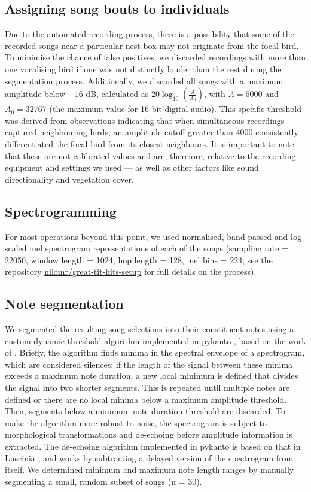 \subsection{Assigning song bouts to individuals}

Due to the automated recording process, there is a possibility that some of the recorded songs near a particular nest box may not originate from the focal bird. To minimise the chance of false positives, we discarded recordings with more than one vocalising bird if one was not distinctly louder than the rest during the segmentation process. Additionally, we discarded all songs with a maximum amplitude below $-16$ dB, calculated as $20 \log_{10}\left(\frac{A}{A_0}\right)$, with $A = 5000$ and $A_0 = 32767$ (the maximum value for 16-bit digital audio). This specific threshold was derived from observations indicating that when simultaneous recordings captured neighbouring birds, an amplitude cutoff greater than 4000 consistently differentiated the focal bird from its closest neighbours. It is important to note that these are not calibrated values and are, therefore, relative to the recording equipment and settings we used --- as well as other factors like sound directionality and vegetation cover.

\subsection{Spectrogramming}

For most operations beyond this point, we used normalised, band-passed and log-scaled mel spectrogram representations of each of the songs (sampling rate = 22050,  window length = 1024, hop length = 128, mel bins = 224; see the repository \href{https://github.com/nilomr/great-tit-hits-setup}{nilomr/great-tit-hits-setup} for full details on the process).

\subsection{Note segmentation}

We segmented the resulting song selections into their constituent notes using a custom dynamic threshold algorithm implemented in pykanto \parencite{merinorecalde2023}, based on the work of \textcite{sainburg2019}. Briefly, the algorithm finds minima in the spectral envelope of a spectrogram, which are considered silences; if the length of the signal between these minima exceeds a maximum note duration, a new local minimum is defined that divides the signal into two shorter segments. This is repeated until multiple notes are defined or there are no local minima below a maximum amplitude threshold. Then, segments below a minimum note duration threshold are discarded. To make the algorithm more robust to noise, the spectrogram is subject to morphological transformations and de-echoing before amplitude information is extracted. The de-echoing algorithm implemented in pykanto is based on that in Luscinia \parencite{lachlan2016a}, and works by subtracting a delayed version of the spectrogram from itself. We determined minimum and maximum note length ranges by manually segmenting a small, random subset of songs (n = 30).

